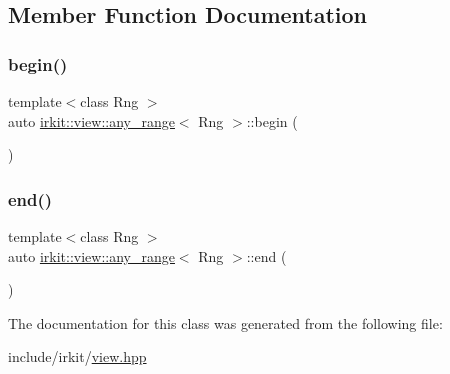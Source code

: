 \subsection{Member Function Documentation}
\mbox{\label{classirkit_1_1view_1_1any__range_a99da248f7fb3fa9e78300f80ee9c8409}} 
\subsubsection{\texorpdfstring{begin()}{begin()}}
{\footnotesize\ttfamily template$<$class Rng $>$ \\
auto \hyperlink{classirkit_1_1view_1_1any__range}{irkit\+::view\+::any\+\_\+range}$<$ Rng $>$\+::begin (\begin{DoxyParamCaption}{ }\end{DoxyParamCaption})\hspace{0.3cm}{\ttfamily [inline]}}

\mbox{\label{classirkit_1_1view_1_1any__range_a192d3e988c56a36695f9ad11c36cb5a6}} 
\subsubsection{\texorpdfstring{end()}{end()}}
{\footnotesize\ttfamily template$<$class Rng $>$ \\
auto \hyperlink{classirkit_1_1view_1_1any__range}{irkit\+::view\+::any\+\_\+range}$<$ Rng $>$\+::end (\begin{DoxyParamCaption}{ }\end{DoxyParamCaption})\hspace{0.3cm}{\ttfamily [inline]}}



The documentation for this class was generated from the following file\+:\begin{DoxyCompactItemize}
\item 
include/irkit/\hyperlink{view_8hpp}{view.\+hpp}\end{DoxyCompactItemize}
